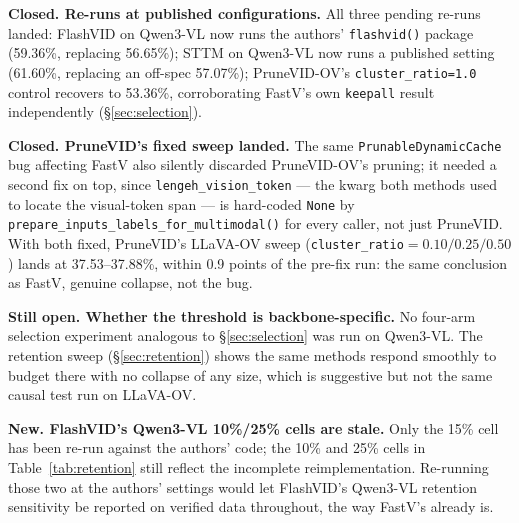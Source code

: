 \documentclass[11pt]{article}
\begin{document}
\textbf{Closed. Re-runs at published configurations.} All three pending
re-runs landed: FlashVID on Qwen3-VL now runs the authors' \texttt{flashvid()}
package (59.36\%, replacing 56.65\%); STTM on Qwen3-VL now runs a published
setting (61.60\%, replacing an off-spec 57.07\%); PruneVID-OV's
\texttt{cluster\_ratio=1.0} control recovers to 53.36\%, corroborating
FastV's own \texttt{keepall} result independently (\S\ref{sec:selection}).

\textbf{Closed. PruneVID's fixed sweep landed.} The same
\texttt{PrunableDynamicCache} bug affecting FastV also silently discarded
PruneVID-OV's pruning; it needed a second fix on top, since
\texttt{lengeh\_vision\_token} --- the kwarg both methods used to locate the
visual-token span --- is hard-coded \texttt{None} by
\texttt{prepare\_inputs\_labels\_for\_multimodal()} for every caller, not
just PruneVID. With both fixed, PruneVID's LLaVA-OV sweep
(\texttt{cluster\_ratio}$=0.10/0.25/0.50$) lands at 37.53--37.88\%, within
0.9 points of the pre-fix run: the same conclusion as FastV, genuine
collapse, not the bug.

\textbf{Still open. Whether the threshold is backbone-specific.} No
four-arm selection experiment analogous to \S\ref{sec:selection} was run on
Qwen3-VL. The retention sweep (\S\ref{sec:retention}) shows the same methods
respond smoothly to budget there with no collapse of any size, which is
suggestive but not the same causal test run on LLaVA-OV.

\textbf{New. FlashVID's Qwen3-VL 10\%/25\% cells are stale.} Only the 15\%
cell has been re-run against the authors' code; the 10\% and 25\% cells in
Table~\ref{tab:retention} still reflect the incomplete reimplementation.
Re-running those two at the authors' settings would let FlashVID's Qwen3-VL
retention sensitivity be reported on verified data throughout, the way
FastV's already is.
\end{document}
